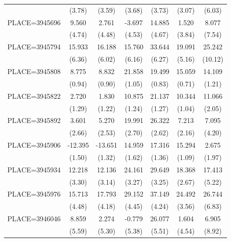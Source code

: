 {\begin{tabular}{l*{6}{c}}
                    &      (3.78)&      (3.59)&      (3.68)&      (3.73)&      (3.07)&      (6.03)\\
PLACE=3945696       &       9.560&       2.761&      -3.697&      14.885&       1.520&       8.077\\
                    &      (4.74)&      (4.48)&      (4.53)&      (4.67)&      (3.84)&      (7.54)\\
PLACE=3945794       &      15.933&      16.188&      15.760&      33.644&      19.091&      25.242\\
                    &      (6.36)&      (6.02)&      (6.16)&      (6.27)&      (5.16)&     (10.12)\\
PLACE=3945808       &       8.775&       8.832&      21.858&      19.499&      15.059&      14.109\\
                    &      (0.94)&      (0.90)&      (1.05)&      (0.83)&      (0.71)&      (1.21)\\
PLACE=3945822       &       2.720&       1.830&      10.875&      21.137&      10.344&      11.066\\
                    &      (1.29)&      (1.22)&      (1.24)&      (1.27)&      (1.04)&      (2.05)\\
PLACE=3945892       &       3.601&       5.270&      19.991&      26.322&       7.213&       7.095\\
                    &      (2.66)&      (2.53)&      (2.70)&      (2.62)&      (2.16)&      (4.20)\\
PLACE=3945906       &     -12.395&     -13.651&      14.959&      17.316&      15.294&       2.675\\
                    &      (1.50)&      (1.32)&      (1.62)&      (1.36)&      (1.09)&      (1.97)\\
PLACE=3945934       &      12.218&      12.136&      24.161&      29.649&      18.368&      17.413\\
                    &      (3.30)&      (3.14)&      (3.27)&      (3.25)&      (2.67)&      (5.22)\\
PLACE=3945976       &      15.713&      17.793&      29.152&      37.149&      24.492&      26.744\\
                    &      (4.48)&      (4.18)&      (4.45)&      (4.24)&      (3.56)&      (6.83)\\
PLACE=3946046       &       8.859&       2.274&      -0.779&      26.077&       1.604&       6.905\\
                    &      (5.59)&      (5.30)&      (5.38)&      (5.51)&      (4.54)&      (8.92)\\

\end{tabular}}
